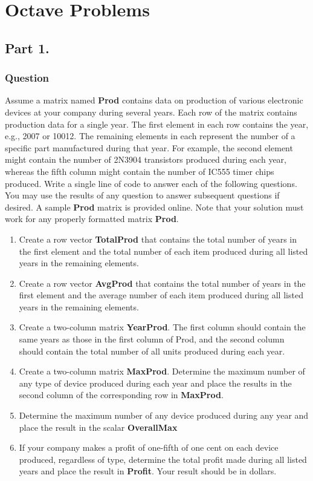 \documentclass[a4paper, 10pt]{article}
\begin{document}
	\section{Octave Problems}
		\subsection{Part 1.}
			\subsubsection{Question}
				\noindent Assume a matrix named \textbf{Prod} contains data on production of various electronic devices at your company during several years. Each row of the
				matrix contains production data for a single year. The first element in each row contains the year, e.g., 2007 or 10012. The remaining elements 
				in each represent the number of a specific part manufactured during that year.
				For example, the second element might contain the number of 2N3904 transistors produced during each year, whereas the fifth column might 
				contain the number of IC555 timer chips produced.
				Write a single line of code to answer each of the following questions. You may use the results of any question to answer subsequent questions if 
				desired. A sample \textbf{Prod} matrix is provided online. Note that your solution must work for any properly formatted matrix \textbf{Prod}.
				
				\begin{enumerate}[label=\alph*.]
					\item Create a row vector \textbf{TotalProd} that contains the total number of years in the first element and the total number of each item produced during all listed years in the remaining elements. 
					\item Create a row vector \textbf{AvgProd} that contains the total number of years in the first element and the average number of each item produced during all listed years in the remaining elements.
					\item Create a two-column matrix \textbf{YearProd}. The first column should contain the same years as those in the first column of Prod, and the second column should contain the total number of all units produced during each year.
					\item Create a two-column matrix \textbf{MaxProd}. Determine the maximum number of any type of device produced during each year and place the results in the second column of the corresponding row in \textbf{MaxProd}.
					\item Determine the maximum number of any device produced during any year and place the result in the scalar \textbf{OverallMax}
					\item If your company makes a profit of one-fifth of one cent on each device produced, regardless of type, determine the total profit made during all listed years and place the result in \textbf{Profit}. Your result should be in dollars.
				\end{enumerate}
\end{document}
